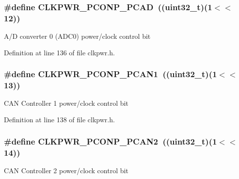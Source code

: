 \subsubsection[{\texorpdfstring{C\+L\+K\+P\+W\+R\+\_\+\+P\+C\+O\+N\+P\+\_\+\+P\+C\+AD}{CLKPWR_PCONP_PCAD}}]{\setlength{\rightskip}{0pt plus 5cm}\#define C\+L\+K\+P\+W\+R\+\_\+\+P\+C\+O\+N\+P\+\_\+\+P\+C\+AD~(({\bf uint32\+\_\+t})(1$<$$<$12))}\hypertarget{group___c_l_k_p_w_r___public___macros_gacf0b90f108501745297500318d00dbaa}{}\label{group___c_l_k_p_w_r___public___macros_gacf0b90f108501745297500318d00dbaa}
A/D converter 0 (A\+D\+C0) power/clock control bit 

Definition at line 136 of file clkpwr.\+h.

\subsubsection[{\texorpdfstring{C\+L\+K\+P\+W\+R\+\_\+\+P\+C\+O\+N\+P\+\_\+\+P\+C\+A\+N1}{CLKPWR_PCONP_PCAN1}}]{\setlength{\rightskip}{0pt plus 5cm}\#define C\+L\+K\+P\+W\+R\+\_\+\+P\+C\+O\+N\+P\+\_\+\+P\+C\+A\+N1~(({\bf uint32\+\_\+t})(1$<$$<$13))}\hypertarget{group___c_l_k_p_w_r___public___macros_ga73d78caa1e5f33ff4f878a4a4188d4f1}{}\label{group___c_l_k_p_w_r___public___macros_ga73d78caa1e5f33ff4f878a4a4188d4f1}
C\+AN Controller 1 power/clock control bit 

Definition at line 138 of file clkpwr.\+h.

\subsubsection[{\texorpdfstring{C\+L\+K\+P\+W\+R\+\_\+\+P\+C\+O\+N\+P\+\_\+\+P\+C\+A\+N2}{CLKPWR_PCONP_PCAN2}}]{\setlength{\rightskip}{0pt plus 5cm}\#define C\+L\+K\+P\+W\+R\+\_\+\+P\+C\+O\+N\+P\+\_\+\+P\+C\+A\+N2~(({\bf uint32\+\_\+t})(1$<$$<$14))}\hypertarget{group___c_l_k_p_w_r___public___macros_ga0359c82f11514929d6981bd3b2c97633}{}\label{group___c_l_k_p_w_r___public___macros_ga0359c82f11514929d6981bd3b2c97633}
C\+AN Controller 2 power/clock control bit 

